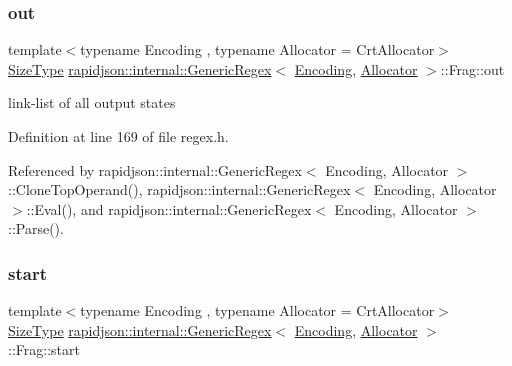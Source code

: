 \subsubsection{\texorpdfstring{out}{out}}
{\footnotesize\ttfamily template$<$typename Encoding , typename Allocator  = Crt\+Allocator$>$ \\
\mbox{\hyperlink{namespacerapidjson_a44eb33eaa523e36d466b1ced64b85c84}{Size\+Type}} \mbox{\hyperlink{classrapidjson_1_1internal_1_1_generic_regex}{rapidjson\+::internal\+::\+Generic\+Regex}}$<$ \mbox{\hyperlink{classrapidjson_1_1_encoding}{Encoding}}, \mbox{\hyperlink{classrapidjson_1_1_allocator}{Allocator}} $>$\+::Frag\+::out}



link-\/list of all output states 



Definition at line 169 of file regex.\+h.



Referenced by rapidjson\+::internal\+::\+Generic\+Regex$<$ Encoding, Allocator $>$\+::\+Clone\+Top\+Operand(), rapidjson\+::internal\+::\+Generic\+Regex$<$ Encoding, Allocator $>$\+::\+Eval(), and rapidjson\+::internal\+::\+Generic\+Regex$<$ Encoding, Allocator $>$\+::\+Parse().

\mbox{\label{structrapidjson_1_1internal_1_1_generic_regex_1_1_frag_a4d212cb7efd36239da71c6a283c83218}} 
\subsubsection{\texorpdfstring{start}{start}}
{\footnotesize\ttfamily template$<$typename Encoding , typename Allocator  = Crt\+Allocator$>$ \\
\mbox{\hyperlink{namespacerapidjson_a44eb33eaa523e36d466b1ced64b85c84}{Size\+Type}} \mbox{\hyperlink{classrapidjson_1_1internal_1_1_generic_regex}{rapidjson\+::internal\+::\+Generic\+Regex}}$<$ \mbox{\hyperlink{classrapidjson_1_1_encoding}{Encoding}}, \mbox{\hyperlink{classrapidjson_1_1_allocator}{Allocator}} $>$\+::Frag\+::start}



